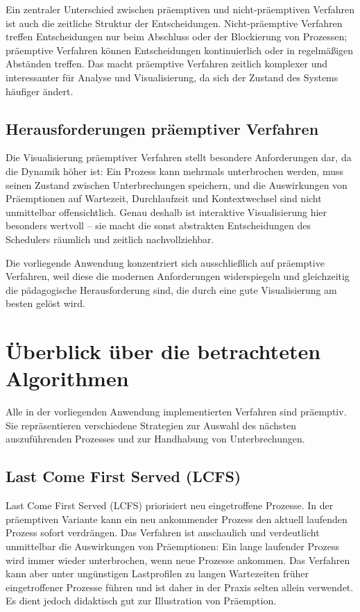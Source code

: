 Ein zentraler Unterschied zwischen präemptiven und nicht-präemptiven Verfahren ist auch die zeitliche Struktur der Entscheidungen. Nicht-präemptive Verfahren treffen Entscheidungen nur beim Abschluss oder der Blockierung von Prozessen; präemptive Verfahren können Entscheidungen kontinuierlich oder in regelmäßigen Abständen treffen. Das macht präemptive Verfahren zeitlich komplexer und interessanter für Analyse und Visualisierung, da sich der Zustand des Systems häufiger ändert.

\subsection{Herausforderungen präemptiver Verfahren}

Die Visualisierung präemptiver Verfahren stellt besondere Anforderungen dar, da die Dynamik höher ist: Ein Prozess kann mehrmals unterbrochen werden, muss seinen Zustand zwischen Unterbrechungen speichern, und die Auswirkungen von Präemptionen auf Wartezeit, Durchlaufzeit und Kontextwechsel sind nicht unmittelbar offensichtlich. Genau deshalb ist interaktive Visualisierung hier besonders wertvoll – sie macht die sonst abstrakten Entscheidungen des Schedulers räumlich und zeitlich nachvollziehbar.

Die vorliegende Anwendung konzentriert sich ausschließlich auf präemptive Verfahren, weil diese die modernen Anforderungen widerspiegeln und gleichzeitig die pädagogische Herausforderung sind, die durch eine gute Visualisierung am besten gelöst wird.

\section{Überblick über die betrachteten Algorithmen}

Alle in der vorliegenden Anwendung implementierten Verfahren sind präemptiv. Sie repräsentieren verschiedene Strategien zur Auswahl des nächsten auszuführenden Prozesses und zur Handhabung von Unterbrechungen.

\subsection{Last Come First Served (LCFS)}

Last Come First Served (LCFS) priorisiert neu eingetroffene Prozesse. In der präemptiven Variante kann ein neu ankommender Prozess den aktuell laufenden Prozess sofort verdrängen. Das Verfahren ist anschaulich und verdeutlicht unmittelbar die Auswirkungen von Präemptionen: Ein lange laufender Prozess wird immer wieder unterbrochen, wenn neue Prozesse ankommen. Das Verfahren kann aber unter ungünstigen Lastprofilen zu langen Wartezeiten früher eingetroffener Prozesse führen und ist daher in der Praxis selten allein verwendet. Es dient jedoch didaktisch gut zur Illustration von Präemption.

